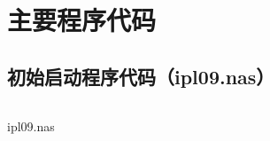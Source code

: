 \chapter{主要程序代码} %

\section{初始启动程序代码（ipl09.nas）}

\begin{listing}[H]
  \inputminted[tabsize=2, 
  linenos=true]{c}{../ZOS/src/kernel/ipl09.nas}
  \caption{ipl09.nas}
  \label{sec:ipl09.nas}
\end{listing}
